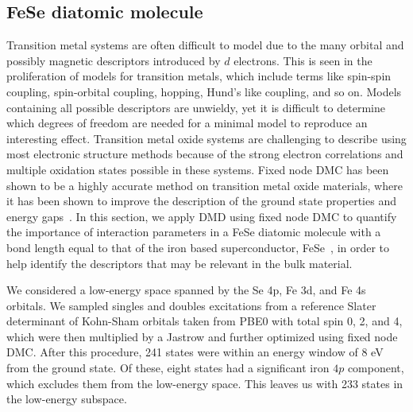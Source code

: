 \subsection{FeSe diatomic molecule}
\label{subsection:fese}
Transition metal systems are often difficult to model due to the many orbital and possibly magnetic descriptors introduced by $d$ electrons.
This is seen in the proliferation of models for transition metals, which include terms like spin-spin coupling, spin-orbital coupling, hopping, Hund's like coupling, and so on.
Models containing all possible descriptors are unwieldy, yet it is difficult to determine which degrees of freedom are needed for a minimal model to reproduce an interesting effect.
Transition metal oxide systems are challenging to describe using most electronic structure methods because of the strong electron correlations and multiple oxidation states possible in these systems. 
Fixed node DMC has been shown to be a highly accurate method on transition metal oxide materials, where it has been shown to improve the description of the ground state properties and energy gaps~\cite{Foyevtsova2014, Wagner_Abbamonte, Zheng2015, Wagner2016}. %
In this section, we apply DMD using fixed node DMC to quantify the importance of interaction parameters in a FeSe diatomic molecule with a bond length equal to that of the iron based superconductor, FeSe~\cite{kumar_crystal_2010}, in order to help identify the descriptors that may be relevant in the bulk material.

We considered a low-energy space spanned by the Se 4p, Fe 3d, and Fe 4s orbitals.
We sampled singles and doubles excitations from a reference Slater determinant of Kohn-Sham orbitals taken from PBE0 with total spin 0, 2, and 4, which were then multiplied by a Jastrow and further optimized using fixed node DMC.
After this procedure, 241 states were within an energy window of 8 eV from the ground state. 
Of these, eight states had a significant iron $4p$ component, which excludes them from the low-energy space.
This leaves us with 233 states in the low-energy subspace.

